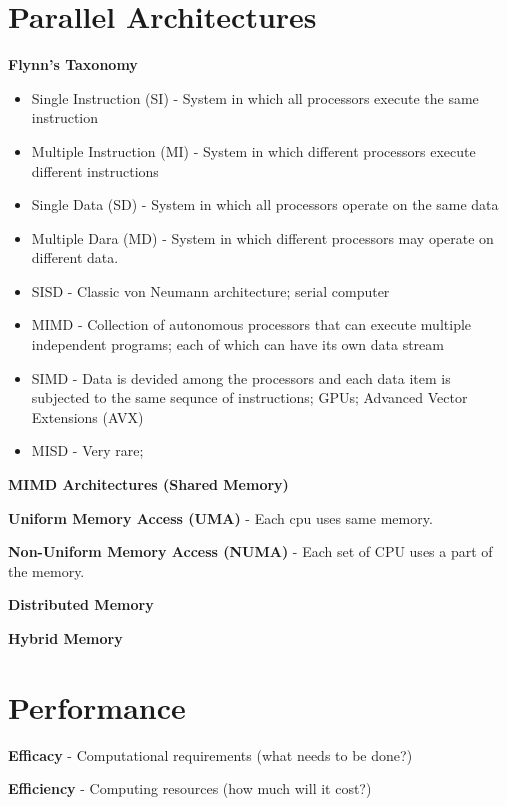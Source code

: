 \section{Parallel Architectures}

\textbf{Flynn's Taxonomy}
\begin{itemize}
    \item Single Instruction (SI) - System in which all processors execute the same instruction
    \item Multiple Instruction (MI) - System in which different processors execute different instructions
    \item Single Data (SD) - System in which all processors operate on the same data
    \item Multiple Dara (MD) - System in which different processors may operate on different data.
\end{itemize}

\begin{itemize}
    \item SISD - Classic von Neumann architecture; serial computer
    \item MIMD - Collection of autonomous processors that can execute multiple independent programs; each of which can have its own data stream
    \item SIMD - Data is devided among the processors and each data item is subjected to the same sequnce of instructions; GPUs; Advanced Vector Extensions (AVX)
    \item  MISD - Very rare;
\end{itemize}

\textbf{MIMD Architectures (Shared Memory)} \par

\textbf{Uniform Memory Access (UMA)} - Each cpu uses same memory. \par

\textbf{Non-Uniform Memory Access (NUMA)} - Each set of CPU uses a part of the memory. \par

\textbf{Distributed Memory} \par

\textbf{Hybrid Memory} \par 

\section{Performance}

\textbf{Efficacy} - Computational requirements (what needs to be done?) \par
\textbf{Efficiency} - Computing resources (how much will it cost?) \par

